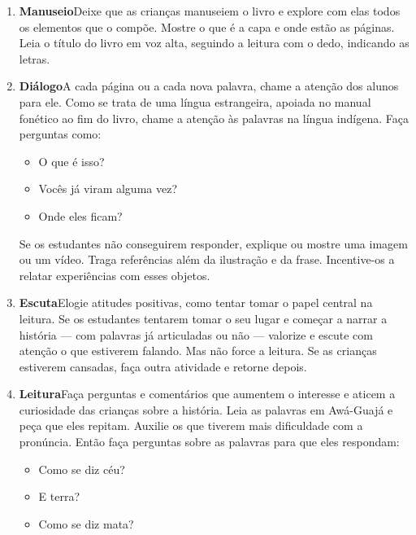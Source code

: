 \documentclass[11pt]{extarticle}
\begin{document}
{{\begin{enumerate}
 
\item \textbf{Manuseio}\quad Deixe que as crianças manuseiem o livro 
e explore com elas todos os elementos que o compõe. Mostre o que é a 
capa e onde estão as páginas. Leia o título do livro em voz alta, seguindo 
a leitura com o dedo, indicando as letras. 

\item \textbf{Diálogo}\quad A cada página ou a cada nova palavra,
chame a atenção dos alunos para ele. Como se trata de uma língua estrangeira, 
apoiada no manual fonético ao fim do livro, chame a atenção às palavras na língua 
indígena. Faça perguntas como:

\begin{itemize}
\item O que é isso?
\item Vocês já viram alguma vez? 
\item Onde eles ficam? 
\end{itemize}

Se os estudantes não conseguirem responder, explique ou mostre uma 
imagem ou um vídeo. Traga referências além da ilustração e da frase. 
Incentive-os a relatar experiências com esses objetos.

\item \textbf{Escuta}\quad Elogie atitudes positivas, como 
tentar tomar o papel central na leitura. Se os estudantes tentarem 
tomar o seu lugar e começar a narrar a história --- com palavras já articuladas 
ou não --- valorize e escute com atenção o que estiverem falando. Mas não 
force a leitura. Se as crianças estiverem cansadas, faça outra atividade 
e retorne depois. 

\item \textbf{Leitura}\quad Faça perguntas e comentários que aumentem o 
interesse e aticem a curiosidade das crianças sobre a história. Leia 
as palavras em Awá-Guajá e peça que eles repitam. Auxilie os que tiverem
mais dificuldade com a pronúncia. Então faça perguntas sobre as palavras
para que eles respondam:

\begin{itemize}
\item Como se diz céu?
\item E terra?
\item Como se diz mata?
\end{itemize}


\end{enumerate}}}
\end{document}
